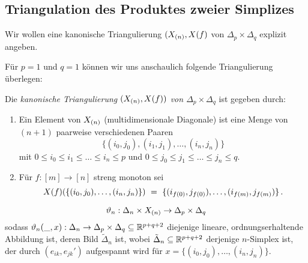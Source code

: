 \subsection{Triangulation des Produktes zweier Simplizes}

Wir wollen eine kanonische Triangulierung $(X_{(n)}, X(f)$ von
$\Delta_p\times \Delta_q$ explizit angeben.

\begin{beispiel}
  Für $p = 1$ und $q=1$ können wir uns anschaulich folgende Triangulierung
  überlegen:
  \begin{center}
  \end{center}
\end{beispiel}


\begin{definition}
  Die \emph{kanonische Triangulierung $(X_{(n)}, X(f))$ von 
  $\Delta_p\times\Delta_q$} ist gegeben durch:
  \begin{enumerate}
    \item Ein Element von $X_{(n)}$ (multidimensionale Diagonale)
      ist eine Menge von $(n+1)$ paarweise verschiedenen Paaren
      \[ \{(i_0,j_0), (i_1,j_1), \ldots, (i_n,j_n)\}\]
      mit $0\leq i_0\leq i_1 \leq\ldots\leq i_n \leq p$
      und $0\leq j_0 \leq j_1 \leq \ldots \leq j_n\leq q$.
    \item Für $f:[m] \to [n]$ streng monoton sei
      \[ X(f)(\{(i_0,j_0), \ldots, (i_n,j_n)\}) \ =\ 
        \{(i_{f(0)}, j_{f(0)}), \ldots, (i_{f(m)}, j_{f(m)})\} \,.\]
  \end{enumerate}
\end{definition}


\begin{definition}
  \[ \vartheta_n: \Delta_n \times X_{(n)} \to \Delta_p\times\Delta_q\]
  sodass $\vartheta_n(\_,x): \Delta_n \to \Delta_p\times\Delta_q \subseteq 
  \mathbb{R}^{p+q+2}$ diejenige lineare, ordnungserhaltende Abbildung ist, deren Bild
  $\tilde\Delta_n$ ist, wobei $\tilde\Delta_n\subseteq\mathbb{R}^{p+q+2}$ derjenige
  $n$-Simplex ist, der durch $(e_{ik},e_{jk}')$ aufgespannt wird für
  $x = \{(i_0,j_0),\ldots,(i_n,j_n)\}$.
\end{definition}

